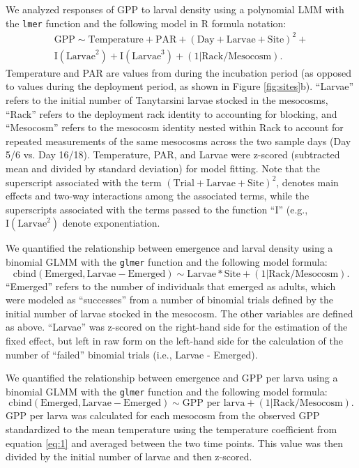 \documentclass[12pt]{article}
\begin{document}
We analyzed responses of GPP to larval density using a 
polynomial LMM with the \texttt{lmer} function and the following model 
in R formula notation: 
%
\begin{multline} \label{eq:1}
\text{GPP} \sim \text{Temperature} + \text{PAR} + (\text{Day} + \text{Larvae} + \text{Site})^2 + \\ 
  \text{I}(\text{Larvae}^2) + \text{I}(\text{Larvae}^3) + (1|\text{Rack}/\text{Mesocosm}).
\end{multline}
%
Temperature and PAR are values from during the incubation period 
(as opposed to values during the deployment period, as shown in Figure \ref{fig:sites}b).
``Larvae'' refers to the initial number of Tanytarsini larvae stocked in the mesocosms,
``Rack'' refers to the deployment rack identity to accounting for blocking,
and ``Mesocosm'' refers to the mesocosm identity nested within Rack 
to account for repeated measurements of the same
mesocosms across the two sample days (Day 5/6 vs. Day 16/18).
Temperature, PAR, and Larvae were z-scored (subtracted mean and divided by standard deviation)
for model fitting.
Note that the superscript associated with the term 
$(\text{Trial} + \text{Larvae} + \text{Site})^2$,
denotes main effects and two-way interactions among the associated terms,
while the superscripts associated with the terms passed to the function ``I''
(e.g., $\text{I}(\text{Larvae}^2)$
denote exponentiation.

We quantified the relationship between emergence and larval density
using a binomial GLMM with the \texttt{glmer} function and the following model formula: 
%
\begin{equation} \label{eq:2}
\text{cbind}(\text{Emerged}, \text{Larvae} - \text{Emerged}) \sim \text{Larvae}*\text{Site} + 
        (1|\text{Rack}/\text{Mesocosm}).
\end{equation}
%
``Emerged'' refers to the number of individuals that emerged as adults,
which were modeled as ``successes'' from a number of binomial trials defined 
by the initial number of larvae stocked in the mesocosm.
The other variables are defined as above. 
``Larvae'' was z-scored on the right-hand side for the estimation
of the fixed effect, but left in raw form on the left-hand side 
for the calculation of the number of ``failed'' binomial trials (i.e., Larvae - Emerged).

We quantified the relationship between emergence and GPP per larva
using a binomial GLMM with the \texttt{glmer} function and the following model formula: 
%
\begin{equation} \label{eq:3}
\text{cbind}(\text{Emerged}, \text{Larvae} - \text{Emerged}) \sim \text{GPP per larva}  + 
          (1|\text{Rack}/\text{Mesocosm}).
\end{equation}
%
GPP per larva was calculated for each mesocosm from the observed GPP standardized to the mean
temperature using the temperature coefficient from equation \ref{eq:1}
and averaged between the two time points.
This value was then divided by the initial number of larvae and then z-scored.
\end{document}
